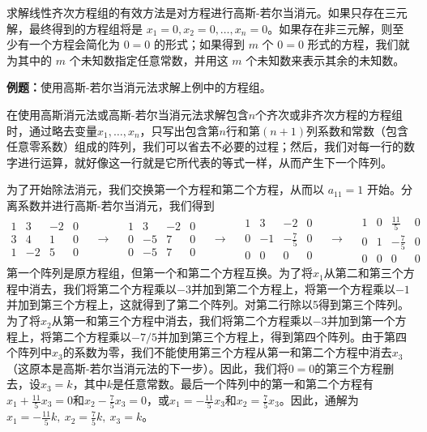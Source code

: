     求解线性齐次方程组的有效方法是对方程进行高斯-若尔当消元。如果只存在三元解，最终得到的方程组将是 $x_1=0,x_2=0,\ldots,x_n=0$。如果存在非三元解，则至少有一个方程会简化为 $0=0$ 的形式；如果得到 $m$ 个 $0=0$ 形式的方程，我们就为其中的 $m$ 个未知数指定任意常数，并用这 $m$ 个未知数来表示其余的未知数。

    \begin{examplebox}
        \textbf{例题：}使用高斯-若尔当消元法求解上例中的方程组。

        在使用高斯消元法或高斯-若尔当消元法求解包含$n$个齐次或非齐次方程的方程组时，通过略去变量$x_1,\ldots,x_n$，只写出包含第$n$行和第$\left(n+1\right)$列系数和常数（包含任意零系数）组成的阵列，我们可以省去不必要的过程；然后，我们对每一行的数字进行运算，就好像这一行就是它所代表的等式一样，从而产生下一个阵列。

        为了开始除法消元，我们交换第一个方程和第二个方程，从而以 $a_{11} = 1$ 开始。分离系数并进行高斯-若尔当消元，我们得到
        \begin{equation*}
            \begin{matrix}
                1 & 3 & -2 & 0 \\
                3 & 4 & 1 & 0 \\
                1 & -2 & 5 & 0
            \end{matrix} \quad \rightarrow \quad 
            \begin{matrix}
                1 & 3 & -2 & 0 \\
                0 & -5 & 7 & 0 \\
                0 & -5 & 7 & 0
            \end{matrix} \quad \rightarrow \quad 
            \begin{matrix}
                1 & 3 & -2 & 0 \\
                0 & -1 & -\frac{7}{5} & 0 \\
                0 & 0 & 0 & 0
            \end{matrix} \quad \rightarrow \quad
            \begin{matrix}
                1 & 0 & \frac{11}{5} & 0 \\
                0 & 1 & -\frac{7}{5} & 0 \\
                0 & 0 & 0 & 0
            \end{matrix}
        \end{equation*}
        第一个阵列是原方程组，但第一个和第二个方程互换。为了将$x_1$从第二和第三个方程中消去，我们将第二个方程乘以$-3$并加到第二个方程上，将第一个方程乘以$-1$并加到第三个方程上，这就得到了第二个阵列。对第二行除以5得到第三个阵列。为了将$x_2$从第一和第三个方程中消去，我们将第二个方程乘以$-3$并加到第一个方程上，将第二个方程乘以$-7/5$并加到第三个方程上，得到第四个阵列。由于第四个阵列中$x_3$的系数为零，我们不能使用第三个方程从第一和第二个方程中消去$x_3$（这原本是高斯-若尔当消元法的下一步）。因此，我们将$0=0$的第三个方程删去，设$x_3=k$，其中$k$是任意常数。最后一个阵列中的第一和第二个方程有$x_1 + \frac{11}{5}x_3 = 0$和$x_2 - \frac{7}{5}x_3 = 0$，或$x_1 = -\frac{11}{5}x_3$和$x_2 = \frac{7}{5}x_3$。因此，通解为$x_1 = -\frac{11}{5}k, \: x_2 = \frac{7}{5}k, \: x_3 = k$。
    \end{examplebox}

